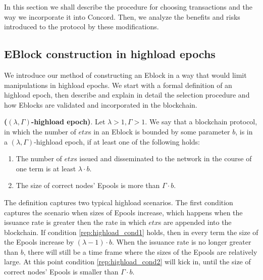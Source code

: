 In this section we shall describe the procedure for choosing transactions and the way we incorporate it into Concord. Then, we analyze the benefits and risks introduced to the protocol by these modifications.

\subsection{EBlock construction in highload epochs}
We introduce our method of constructing an Eblock in a way that would limit manipulations in highload epochs. We start with a formal definition of an highload epoch, then describe and explain in detail the selection procedure and how Eblocks are validated and incorporated in the blockchain.

\begin{definition}{\textbf{($(\lambda,\Gamma)$-highload epoch)}}\label{def:highload}. 
Let $\lambda>1,\Gamma>1$. We say that a blockchain protocol, in which the number of $etx$s in an Eblock is bounded by some parameter $b$, is in a $(\lambda,\Gamma)$-highload epoch, if at least one of the following holds: 
	\begin{enumerate}
    	\item \label{rep:highload_cond1}The number of $etx$s issued and disseminated to the network in the course of one term is at least $\lambda \cdot b$.
        \item \label{rep:highload_cond2} The size of correct nodes' Epools is more than $\Gamma \cdot  b$. 
    \end{enumerate}
\end{definition}

The definition captures two typical highload scenarios. The first condition captures the scenario when sizes of Epools increase, which happens when the issuance rate is greater then the rate in which $etx$s are appended into the blockchain. If condition \ref{rep:highload_cond1} holds, then in every term the size of the Epools increase by $(\lambda-1)\cdot b$. When the issuance rate is no longer greater than $b$, there will still be a time frame where the sizes of the Epools are relatively large. At this point condition \ref{rep:highload_cond2} will kick in, until the size of correct nodes' Epools is smaller than $\Gamma \cdot b$.

